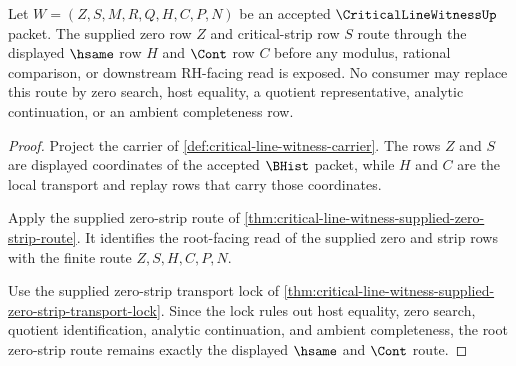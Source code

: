 \begin{theorem}
\label{thm:critical-line-witness-root-zero-strip-route}
Let $W=(Z,S,M,R,Q,H,C,P,N)$ be an accepted $\CriticalLineWitnessUp$ packet. The supplied zero row $Z$ and critical-strip row $S$ route through the displayed $\hsame$ row $H$ and $\Cont$ row $C$ before any modulus, rational comparison, or downstream RH-facing read is exposed. No consumer may replace this route by zero search, host equality, a quotient representative, analytic continuation, or an ambient completeness row.
\end{theorem}
\begin{proof}
Project the carrier of \autoref{def:critical-line-witness-carrier}. The rows $Z$ and $S$ are displayed coordinates of the accepted $\BHist$ packet, while $H$ and $C$ are the local transport and replay rows that carry those coordinates.

Apply the supplied zero-strip route of \autoref{thm:critical-line-witness-supplied-zero-strip-route}. It identifies the root-facing read of the supplied zero and strip rows with the finite route $Z,S,H,C,P,N$.

Use the supplied zero-strip transport lock of \autoref{thm:critical-line-witness-supplied-zero-strip-transport-lock}. Since the lock rules out host equality, zero search, quotient identification, analytic continuation, and ambient completeness, the root zero-strip route remains exactly the displayed $\hsame$ and $\Cont$ route.
\end{proof}

